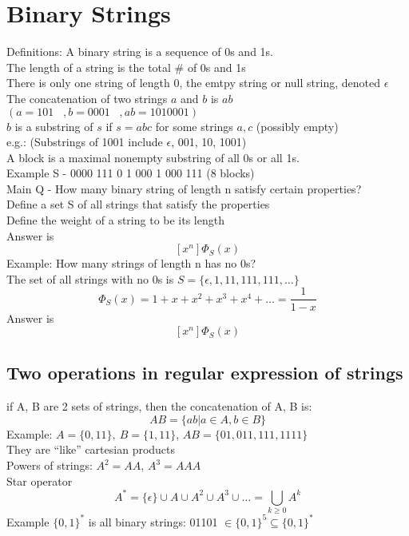 \documentclass{article}
\newcommand{\NP}{\newpage \vspace*{-0.4in}}
\begin{document}
\section*{Binary Strings}
Definitions: A binary string is a sequence of 0s and 1s.\\
The length of a string is the total \# of 0s and 1s\\
There is only one string of length 0, the emtpy string or null string, denoted $\epsilon$\\
The concatenation of two strings $a$ and $b$ is $ab$\\
$(a=101\hspace{10pt},b=0001 \hspace{10pt}, ab=1010001)$\\
$b$ is a substring of $s$ if $s=abc$ for some strings $a,c$ (possibly empty)\\
e.g.: (Substrings of 1001 include $\epsilon$, 001, 10, 1001)\\
A block is a maximal nonempty substring of all 0s or all 1s. \\
Example S - 0000 111 0 1 000 1 000 111     (8 blocks)\\

Main Q - How many binary string of length n satisfy certain properties? \\
Define a set S of all strings that satisfy the properties\\
Define the weight of a string to be its length\\
Answer is $$ [x^n]  \Phi_S(x)$$
Example: How many strings of length n has no 0s?\\
The set of all strings with no 0s is $S=\{ \epsilon, 1, 11, 111, 111, \hdots \}$\\
$$\Phi_S(x)=1+x+x^2+x^3+x^4+\hdots=\frac{1}{1-x}$$
Answer is $$ [x^n]  \Phi_S(x)$$
\subsection*{Two operations in regular expression of strings}
if A, B are 2 sets of strings, then the concatenation of A, B is: $$AB=\{ab|a\in A, b\in B\}$$
Example: $A=\{0,11\},\ B=\{1,11\}$, $AB=\{01, 011, 111, 1111\}$ \\
They are ``like'' cartesian products\\
Powers of strings: $A^2=AA$, $A^3=AAA$\\
Star operator $$A^*=\{\epsilon\} \cup A \cup A^2 \cup A^3 \cup \hdots=\bigcup_{k\geq 0}A^k$$
Example $\{0,1\}^*$ is all binary strings: 01101 $\in \{0,1\}^5 \subseteq \{0,1\}^*$
\NP
\end{document}
